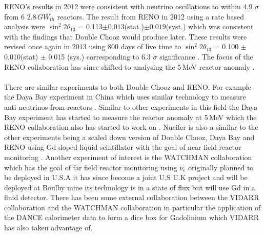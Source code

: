 RENO's results in 2012 were consistent with neutrino oscillations to within 4.9 $\sigma$ from 6 2.8\,$GW_{th}$ reactors. The result from RENO in 2012 using a rate based analysis were $\sin^2{2\theta_{13}}$ = 0.113$\pm0.013$(stat.)$\pm0.019$(syst.) which was consistent with the findings that Double Chooz would produce later. These results were revised once again in 2013 using 800 days of live time to $\sin^2{2\theta_{13}}$ = 0.100 $\pm$ 0.010(stat) $\pm$ 0.015 (sys.) corresponding to 6.3 $\sigma$ significance \cite{reno2013}. The focus of the RENO collaboration has since shifted to analysing the 5\,MeV reactor anomaly \cite{reno_may_2019}.  
\\\\There are similar experiments to both Double Chooz and RENO. For example the Daya Bay experiment in China which uses similar technology to measure anti-neutrinos from reactors \cite{DayaBay2007Precision}. Similar to other experiments in this field the Daya Bay experiment has started to measure the reactor anomaly at 5\,MeV \cite{Daya_Bay_2017} which the RENO collaboration also has started to work on \cite{reno_may_2019}. Nucifer is also a similar to the other experiments being a scaled down version of Double Chooz, Daya Bay and RENO using Gd doped liquid scintillator with the goal of near field reactor monitoring \cite{nucifer2016}. Another experiment of interest is the WATCHMAN collaboration which has the goal of far field reactor monitoring using $\bar{\nu_e}$ originally planned to be deployed in U.S.A \cite{askins2015physics} it has since become a joint U.S U.K project and will be deployed at Boulby mine \cite{burns2018remote} its technology is in a state of flux but will use Gd in a fluid detector. There has been some external collaboration between the VIDARR collaboration and the WATCHMAN collaboration in particular the application of the DANCE calorimeter data to form a dice box for Gadolinium which VIDARR has also taken advantage of. %
